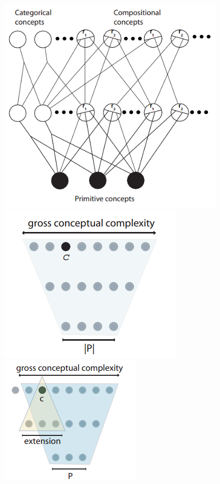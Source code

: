 \begin{figure}[!h]
  \centering
  \includegraphics[scale=0.3]{imagens/rede2.png}
  \includegraphics[scale=0.45]{imagens/rede3.png}
  \includegraphics[scale=0.5]{imagens/rede4.png}

\end{figure}
